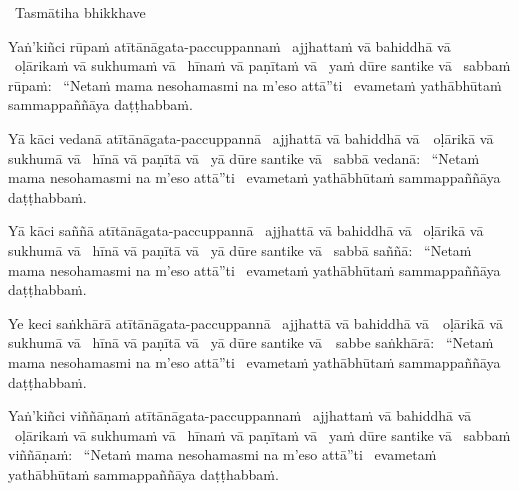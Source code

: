 \begin{pali-leader}
  \anglebracketleft\ \hspace{-0.5mm}Tasmātiha bhikkhave \hspace{-0.5mm}\anglebracketright\
\end{pali-leader}
\begin{pali-hangtogether}
  Yaṅ'kiñci rūpaṁ atītānāgata-paccuppannaṁ \breathmark\ ajjhattaṁ vā bahiddhā vā \breathmark\ oḷārikaṁ vā sukhumaṁ vā \breathmark\ hīnaṁ vā paṇītaṁ vā \breathmark\ yaṁ dūre santike vā \breathmark\ sabbaṁ rūpaṁ: \breathmark\ ``Netaṁ mama nesohamasmi na m'eso attā''ti \breathmark\ evametaṁ yathābhūtaṁ sammappaññāya daṭṭhabbaṁ.
\end{pali-hangtogether}

\begin{pali-hang}
  Yā kāci vedanā atītānāgata-paccuppannā \breathmark\ ajjhattā vā bahiddhā \mbox{vā}~\breathmark\ oḷārikā vā sukhumā vā \breathmark\ hīnā vā paṇītā vā \breathmark\ yā dūre santike vā \breathmark\ sabbā vedanā: \breathmark\ ``Netaṁ mama nesohamasmi na m'eso attā''ti \breathmark\ evametaṁ yathābhūtaṁ sammappaññāya daṭṭhabbaṁ.
\end{pali-hang}

\begin{pali-hang}
  Yā kāci saññā atītānāgata-paccuppannā \breathmark\ ajjhattā vā bahiddhā vā \breathmark\ oḷārikā vā sukhumā vā \breathmark\ hīnā vā paṇītā vā \breathmark\ yā dūre santike vā \breathmark\ sabbā saññā: \breathmark\ ``Netaṁ mama nesohamasmi na m'eso attā''ti \breathmark\ evametaṁ yathābhūtaṁ sammappaññāya daṭṭhabbaṁ.
\end{pali-hang}

\begin{pali-hang}
  Ye keci saṅkhārā atītānāgata-paccuppannā \breathmark\ ajjhattā vā bahiddhā \mbox{vā}~\breathmark\ oḷārikā vā sukhumā vā \breathmark\ hīnā vā paṇītā vā \breathmark\ yā dūre santike \mbox{vā}~\breathmark\ sabbe saṅkhārā: \breathmark\ ``Netaṁ mama nesohamasmi na m'eso attā''ti \breathmark\ evametaṁ yathābhūtaṁ sammappaññāya daṭṭhabbaṁ.
\end{pali-hang}

\begin{pali-hang}
  Yaṅ'kiñci viññāṇaṁ atītānāgata-paccuppannaṁ \breathmark\ ajjhattaṁ vā bahiddhā vā \breathmark\ oḷārikaṁ vā sukhumaṁ vā \breathmark\ hīnaṁ vā paṇītaṁ vā \breathmark\ yaṁ dūre santike vā \breathmark\ sabbaṁ viññāṇaṁ: \breathmark\ ``Netaṁ mama nesohamasmi na m'eso attā''ti \breathmark\ evametaṁ yathābhūtaṁ sammappaññāya daṭṭhabbaṁ.
\end{pali-hang}

